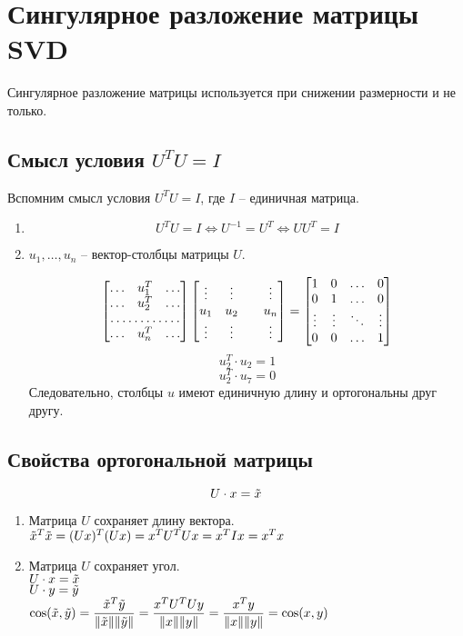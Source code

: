 \documentclass[12pt]{article} %
\theoremstyle{definition} %
\begin{document}
\section{Сингулярное разложение матрицы SVD}
Сингулярное разложение матрицы используется при снижении размерности и не только.
\subsection{Смысл условия $U^T U= I$}
 Вспомним смысл условия $U^T U= I$, где $I$ -- единичная матрица.\\
\begin{enumerate}
\item  \[U^T U= I \Leftrightarrow U^{-1}=U^T \Leftrightarrow UU^T=I \]
\item  $u_1, \ldots, u_n$ -- вектор-столбцы матрицы $U$.

\[ \begin{bmatrix}
\dots & u_1^T & \dots  \\
\dots & u_2^T & \dots  \\
\hdotsfor{3} \\
\dots & u_n^T & \dots  
\end{bmatrix}
 \begin{bmatrix}
\vdots & \vdots &   & \vdots \\
u_1 & u_2 &  & u_n \\
\vdots & \vdots & & \vdots 
\end{bmatrix} =
\begin{bmatrix}
1 & 0 & \hdots & 0 \\
0 & 1 & \hdots & 0 \\
\vdots & \vdots & \ddots & \vdots \\
0 & 0 & \hdots & 1 \\
\end{bmatrix}
\]
\[
u_2^T \cdot u_2 = 1
\]
\[
u_2^T \cdot u_7 = 0
\]
Следовательно, столбцы $u$ имеют единичную длину и ортогональны друг другу.\\
\end{enumerate}
\subsection{Свойства ортогональной матрицы}
\[ U \cdot x=\Tilde{x} \]
\begin{enumerate}
\item Матрица $U$ сохраняет длину вектора.\\
$\Tilde{x}^T \Tilde{x}= (Ux)^T (Ux)= x^T U^T U x = x^T I x=x^T x$
\item Матрица $U$ сохраняет угол.\\
$U \cdot x=\Tilde{x}$\\
$U \cdot y=\Tilde{y}$\\
$\cos(\Tilde{x},\Tilde{y})= \dfrac{\Tilde{x}^T\Tilde{y}}{\|\Tilde{x}\|\|\Tilde{y}\|}=
\dfrac{x^T U^T Uy}{\|x\|\|y\|}= \dfrac{x^Ty}{\|x\|\|y\|}=\cos(x,y)$\\
\end{enumerate}
\end{document}
